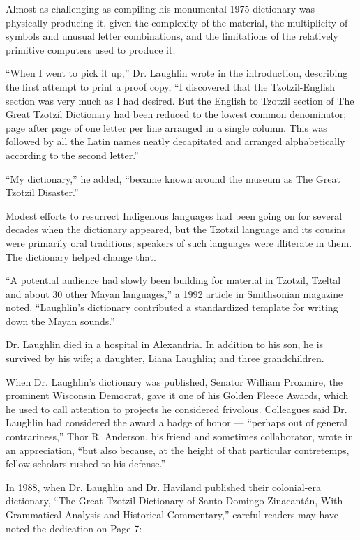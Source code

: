 Almost as challenging as compiling his monumental 1975 dictionary was
physically producing it, given the complexity of the material, the
multiplicity of symbols and unusual letter combinations, and the
limitations of the relatively primitive computers used to produce it.

``When I went to pick it up,'' Dr. Laughlin wrote in the introduction,
describing the first attempt to print a proof copy, ``I discovered that
the Tzotzil-English section was very much as I had desired. But the
English to Tzotzil section of The Great Tzotzil Dictionary had been
reduced to the lowest common denominator; page after page of one letter
per line arranged in a single column. This was followed by all the Latin
names neatly decapitated and arranged alphabetically according to the
second letter.''

``My dictionary,'' he added, ``became known around the museum as The
Great Tzotzil Disaster.''

Modest efforts to resurrect Indigenous languages had been going on for
several decades when the dictionary appeared, but the Tzotzil language
and its cousins were primarily oral traditions; speakers of such
languages were illiterate in them. The dictionary helped change that.

``A potential audience had slowly been building for material in Tzotzil,
Tzeltal and about 30 other Mayan languages,'' a 1992 article in
Smithsonian magazine noted. ``Laughlin's dictionary contributed a
standardized template for writing down the Mayan sounds.''

Dr. Laughlin died in a hospital in Alexandria. In addition to his son,
he is survived by his wife; a daughter, Liana Laughlin; and three
grandchildren.

When Dr. Laughlin's dictionary was published,
\href{https://www.nytimes.com/2005/12/16/us/william-proxmire-maverick-democratic-senator-from-wisconsin-is-dead-at.html?searchResultPosition=1}{Senator
William Proxmire}, the prominent Wisconsin Democrat, gave it one of his
Golden Fleece Awards, which he used to call attention to projects he
considered frivolous. Colleagues said Dr. Laughlin had considered the
award a badge of honor --- ``perhaps out of general contrariness,'' Thor
R. Anderson, his friend and sometimes collaborator, wrote in an
appreciation, ``but also because, at the height of that particular
contretemps, fellow scholars rushed to his defense.''

In 1988, when Dr. Laughlin and Dr. Haviland published their colonial-era
dictionary, ``The Great Tzotzil Dictionary of Santo Domingo Zinacantán,
With Grammatical Analysis and Historical Commentary,'' careful readers
may have noted the dedication on Page 7:

